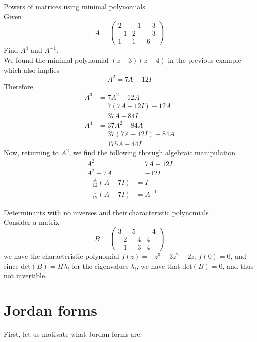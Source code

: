\documentclass[journal, letterpaper]{IEEEtran}
\begin{document}
    \begin{myboxg}{Powers of matrices using minimal polynomials} \\ 
        Given
        $$ A = \begin{pmatrix}
            2 & -1 & -3 \\-1 & 2 & -3 \\1 & 1 & 6
        \end{pmatrix}$$
        Find $A^4$ and $A^{-1}$.
        \newline \\
        We found the minimal polynomial $(z - 3)(z - 4)$ in the previous example which also implies
        $$ A^2 = 7A - 12I$$
        Therefore
        \begin{align*}
            A^3 &= 7A^2 - 12A \\
            &= 7(7A - 12I) - 12A \\
            &= 37A - 84I \\
            A^4 &= 37A^2 - 84A \\
            &= 37(7A - 12I) - 84A \\ 
            &= 175A - 44I
        \end{align*}
        Now, returning to $A^2$, we find the following thorugh algebraic manipulation
        \begin{align*}
            A^2 &= 7A - 12I \\ 
            A^2 - 7A &= -12I \\ 
            -\frac{A}{12}(A - 7I) &= I \\ 
            -\frac{1}{12}(A - 7I) &= A^{-1}
        \end{align*}
    \end{myboxg}
    \begin{myboxr}{Determinants with no inverses and their characteristic polynomials} \\ 
        Consider a matrix 
        $$ B = \begin{pmatrix}
            3 & 5 & -4 \\ -2 & -4 & 4 \\ -1 & -3 & 4
        \end{pmatrix}$$
        we have the characteristic polynomial $f(z) = -z^3 + 3z^2 - 2z$. $f(0) = 0$, and since $\text{det}(B) = \Pi \lambda_i$ for the eigenvalues $\lambda_i$, we have that $\text{det}(B) = 0$, and thus not invertible.
    \end{myboxr}
    \section{Jordan forms}
    First, let us motivate what Jordan forms are.
\end{document}
